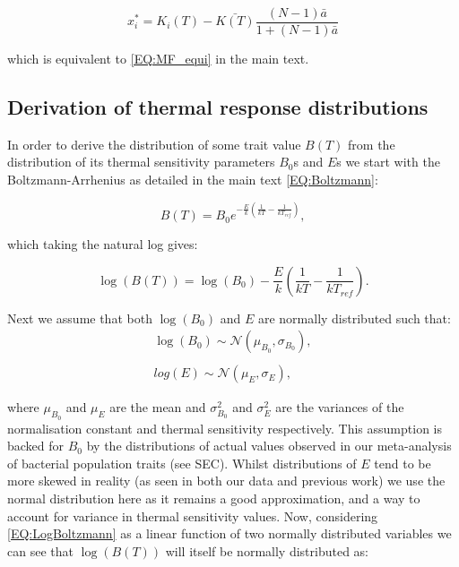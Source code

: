 \documentclass{article}
\begin{document}
\begin{equation*}
    x_i^* = K_i(T) - \bar{K(T)}\frac{(N-1)\bar{a}}{1 + (N-1)\bar{a}}
\end{equation*}

which is equivalent to \cref{EQ:MF_equi} in the main text.

\subsection*{Derivation of thermal response distributions} \label{SI_Sec:TPC_dist}

In order to derive the distribution of some trait value $B(T)$ from the distribution of its thermal sensitivity parameters $B_0$s and $E$s we start with the Boltzmann-Arrhenius as detailed in the main text \cref{EQ:Boltzmann}:

\begin{equation*}
    B(T) = B_0 e^{-\frac{E}{k} \left(\frac{1}{kT} - \frac{1}{k T_{ref} }\right)},
\end{equation*}
 
which taking the natural log gives:

\begin{equation} \label{EQ:LogBoltzmann}
    \log(B(T)) = \log(B_0) - \frac{E}{k} \left(\frac{1}{kT} - \frac{1}{kT_{ref}} \right).
\end{equation}
 
Next we assume that both $\log(B_0)$ and $E$ are normally distributed such that:
\begin{align*}
    \log(B_0) \sim \mathcal{N}(\mu_{B_0}, \sigma_{B_0}), \\
    \\
    log(E) \sim \mathcal{N}(\mu_E, \sigma_{E}),
\end{align*}

where $\mu_{B_0}$ and $\mu_E$ are the mean and $\sigma_{B_0}^2$ and $\sigma_{E}^2$ are the variances of the normalisation constant and thermal sensitivity respectively. This assumption is backed for $B_0$ by the distributions of actual values observed in our meta-analysis of bacterial population traits (see SEC). Whilst distributions of $E$ tend to be more skewed in reality (as seen in both our data and previous work) we use the normal distribution here as it remains a good approximation, and a way to account for variance in thermal sensitivity values. Now, considering \cref{EQ:LogBoltzmann} as a linear function of two normally distributed variables we can see that $\log(B(T))$ will itself be normally distributed as:
\end{document}
